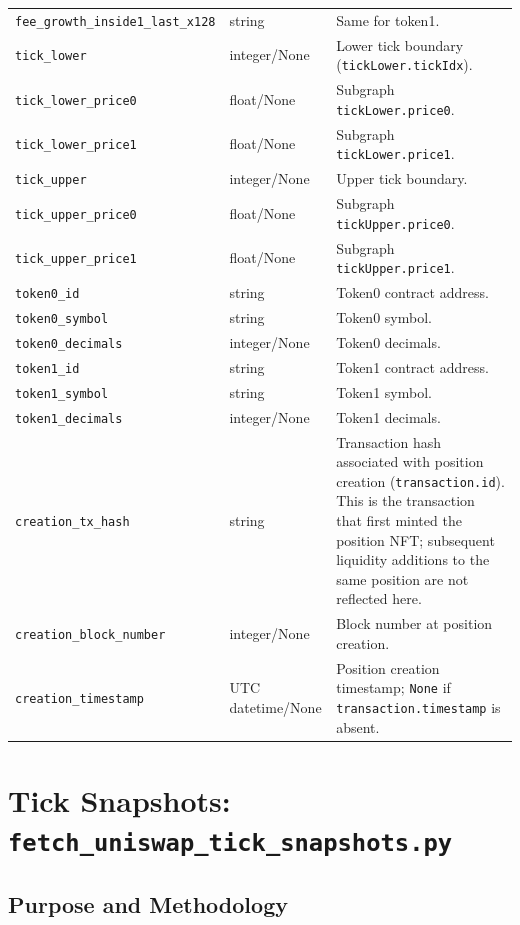 \documentclass[11pt,a4paper]{article}
\begin{document}
\begin{xltabular}{\linewidth}{L{4.8cm}L{3.0cm}Y}
\texttt{fee\_growth\_inside1\_last\_x128} & string & Same for token1. \\
\texttt{tick\_lower} & integer/None & Lower tick boundary
  (\texttt{tickLower.tickIdx}). \\
\texttt{tick\_lower\_price0} & float/None & Subgraph
  \texttt{tickLower.price0}. \\
\texttt{tick\_lower\_price1} & float/None & Subgraph
  \texttt{tickLower.price1}. \\
\texttt{tick\_upper} & integer/None & Upper tick boundary. \\
\texttt{tick\_upper\_price0} & float/None & Subgraph
  \texttt{tickUpper.price0}. \\
\texttt{tick\_upper\_price1} & float/None & Subgraph
  \texttt{tickUpper.price1}. \\
\texttt{token0\_id} & string & Token0 contract address. \\
\texttt{token0\_symbol} & string & Token0 symbol. \\
\texttt{token0\_decimals} & integer/None & Token0 decimals. \\
\texttt{token1\_id} & string & Token1 contract address. \\
\texttt{token1\_symbol} & string & Token1 symbol. \\
\texttt{token1\_decimals} & integer/None & Token1 decimals. \\
\texttt{creation\_tx\_hash} & string & Transaction hash associated with
  position creation (\texttt{transaction.id}). This is the transaction
  that first minted the position NFT; subsequent liquidity additions to
  the same position are not reflected here. \\
\texttt{creation\_block\_number} & integer/None & Block number at
  position creation. \\
\texttt{creation\_timestamp} & UTC datetime/None & Position creation
  timestamp; \texttt{None} if \texttt{transaction.timestamp} is absent. \\
\bottomrule
\end{xltabular}

\section{Tick Snapshots: \texttt{fetch\_uniswap\_tick\_snapshots.py}}
\label{sec:ticks}

\subsection{Purpose and Methodology}
\end{document}
